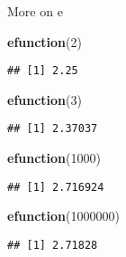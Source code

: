 \documentclass[
  ignorenonframetext,
]{beamer}
\newenvironment{Shaded}{\begin{snugshade}}{\end{snugshade}}
\newcommand{\DecValTok}[1]{\textcolor[rgb]{0.00,0.00,0.81}{#1}}
\newcommand{\KeywordTok}[1]{\textcolor[rgb]{0.13,0.29,0.53}{\textbf{#1}}}
\newcommand{\NormalTok}[1]{#1}
\begin{document}
\begin{frame}[fragile]{More on e}
\protect\hypertarget{more-on-e-4}{}

\begin{Shaded}
\begin{Highlighting}[]
\KeywordTok{efunction}\NormalTok{(}\DecValTok{2}\NormalTok{)}
\end{Highlighting}
\end{Shaded}

\begin{verbatim}
## [1] 2.25
\end{verbatim}

\begin{Shaded}
\begin{Highlighting}[]
\KeywordTok{efunction}\NormalTok{(}\DecValTok{3}\NormalTok{)}
\end{Highlighting}
\end{Shaded}

\begin{verbatim}
## [1] 2.37037
\end{verbatim}

\begin{Shaded}
\begin{Highlighting}[]
\KeywordTok{efunction}\NormalTok{(}\DecValTok{1000}\NormalTok{)}
\end{Highlighting}
\end{Shaded}

\begin{verbatim}
## [1] 2.716924
\end{verbatim}

\begin{Shaded}
\begin{Highlighting}[]
\KeywordTok{efunction}\NormalTok{(}\DecValTok{1000000}\NormalTok{)}
\end{Highlighting}
\end{Shaded}

\begin{verbatim}
## [1] 2.71828
\end{verbatim}

\end{frame}
\end{document}
